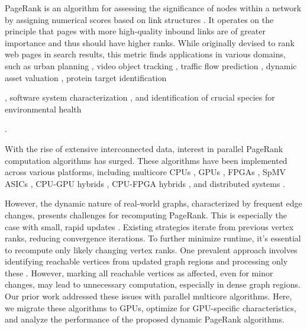 PageRank is an algorithm for assessing the significance of nodes within a network by assigning numerical scores based on link structures \cite{rank-page99}. It operates on the principle that pages with more high-quality inbound links are of greater importance and thus should have higher ranks. While originally devised to rank web pages in search results, this metric finds applications in various domains, such as urban planning \cite{urban-zhang18}, video object tracking \cite{gong2013pagerank}, traffic flow prediction \cite{traffic-kim15}, dynamic asset valuation \cite{sawilla2006abstracting}, protein target identification \cite{banky2013equal}, software system characterization \cite{chepelianskii2010towards}, and identification of crucial species for environmental health \cite{allesina2009googling}.

With the rise of extensive interconnected data, interest in parallel PageRank computation algorithms has surged. These algorithms have been implemented across various platforms, including multicore CPUs \cite{rank-garg16, rank-beamer17, rank-lakhotia18, grutzmacher2020acceleration, huang2020accelerating, chen2021hipa}, GPUs \cite{duong2012parallel, rank-nvgraph, grutzmacher2018high, piccinotti2019solving, grutzmacher2020acceleration, kang2020computing, concessao2023meerkat}, FPGAs \cite{rank-guoqiang20}, SpMV ASICs \cite{rank-sadi18}, CPU-GPU hybrids \cite{rank-giri20}, CPU-FPGA hybrids \cite{usta2020accelerating, rank-li21, rank-hassan21, rank-mughrabi21}, and distributed systems \cite{rank-sarma13, kang2022analyzing, vandromme2022scaling}.

However, the dynamic nature of real-world graphs, characterized by frequent edge changes, presents challenges for recomputing PageRank. This is especially the case with small, rapid updates \cite{agarwal2012real, barros2021survey}. Existing strategies iterate from previous vertex ranks, reducing convergence iterations. To further minimize runtime, it's essential to recompute only likely changing vertex ranks. One prevalent approach involves identifying reachable vertices from updated graph regions and processing only these \cite{rank-desikan05, kim2015incremental, rank-giri20, sahu2022dynamic}. However, marking all reachable vertices as affected, even for minor changes, may lead to unnecessary computation, especially in dense graph regions. Our prior work \cite{sahu2024df} addressed these issues with parallel multicore algorithms. Here, we migrate these algorithms to GPUs, optimize for GPU-specific characteristics, and analyze the performance of the proposed dynamic PageRank algorithms.




